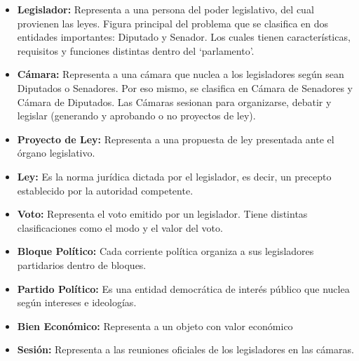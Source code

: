 \begin{itemize}
\item \textbf{Legislador: } Representa a una persona del poder legislativo, del cual provienen las leyes. Figura principal del problema que se clasifica en dos entidades importantes: Diputado y Senador. Los cuales tienen caracter\'isticas, requisitos y funciones distintas dentro del \lq parlamento\rq . 

\quad 

\item \textbf{C\'amara: } Representa a una c\'amara que nuclea a los legisladores seg\'un sean Diputados o Senadores. Por eso mismo, se clasifica en C\'amara de Senadores y C\'amara de Diputados. Las C\'amaras sesionan para organizarse, debatir y legislar (generando y aprobando o no proyectos de ley).

\quad

\item \textbf{Proyecto de Ley: } Representa a una propuesta de ley presentada ante el \'organo legislativo.

\quad

\item \textbf{Ley: } Es la norma jur\'idica dictada por el legislador, es decir, un precepto establecido por la autoridad competente.

\quad

\item \textbf{Voto: } Representa el voto emitido por un legislador. Tiene distintas clasificaciones como el modo y el valor del voto.

\quad

\item \textbf{Bloque Pol\'itico: } Cada corriente pol\'itica organiza a sus legisladores partidarios dentro de bloques.

\quad

\item \textbf{Partido Pol\'itico: } Es una entidad democr\'atica de inter\'es p\'ublico que nuclea seg\'un intereses e ideolog\'ias. 

\quad

\item \textbf{Bien Econ\'omico: } Representa a un objeto con valor econ\'omico

\quad

\item \textbf{Sesi\'on: } Representa a las reuniones oficiales de los legisladores en las c\'amaras.

\quad


\end{itemize}
